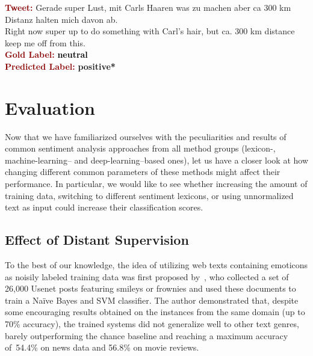 \begin{example}\label{snt:cgsa:exmp:lba-error}
  \noindent\textup{\bfseries\textcolor{darkred}{Tweet:}} {\upshape
    \colorbox{green!0.5!blue!0.4}{Gerade} \colorbox{green!89}{super} \colorbox{blue!0.3}{Lust}, mit \colorbox{white!2}{Carls} Haaren \colorbox{white!0.6}{was} zu \colorbox{green!1}{machen} \colorbox{green!0.3}{aber} \colorbox{white!2}{ca} 300 \colorbox{white!1}{km}
    \colorbox{white!1}{Distanz} halten \colorbox{blue!0.3}{mich} davon \colorbox{white!1}{ab}.}\\
  \noindent \colorbox{green!0.5!blue!0.4}{Right now} \colorbox{green!89}{super} \colorbox{blue!0.3}{up to} \colorbox{green!1}{do} \colorbox{white!0.6}{something} with \colorbox{white!2}{Carl}'s hair, \colorbox{green!0.3}{but} \colorbox{white!2}{ca.} 300 \colorbox{white!1}{km}
  \colorbox{white!1}{distance} keep \colorbox{blue!0.3}{me} \colorbox{white!1}{off} from this.\\[\exampleSep]
  \noindent\textup{\bfseries\textcolor{darkred}{Gold Label:}}\hspace*{4.3em}\textbf{%
    \upshape\textcolor{black}{neutral}}\\
 \noindent\textup{\bfseries\textcolor{darkred}{Predicted Label:}}\hspace*{2em}\textbf{%
    \upshape\textcolor{green3}{positive*}}
\end{example}


\section{Evaluation}

Now that we have familiarized ourselves with the peculiarities and
results of common sentiment analysis approaches from all method groups
(lexicon-, machine-learning-- and deep-learning--based ones), let us
have a closer look at how changing different common parameters of
these methods might affect their performance.  In particular, we would
like to see whether increasing the amount of training data, switching
to different sentiment lexicons, or using unnormalized text as input
could increase their classification scores.

\subsection{Effect of Distant Supervision}
\todo[inline]{}

To the best of our knowledge, the idea of utilizing web texts
containing emoticons as noisily labeled training data was first
proposed by~\citet{Read:05}, who collected a set of 26,000 Usenet
posts featuring smileys or frownies and used these documents to train
a Na{\"i}ve Bayes and SVM classifier.  The author demonstrated that,
despite some encouraging results obtained on the instances from the
same domain (up to 70\% accuracy), the trained systems did not
generalize well to other text genres, barely outperforming the chance
baseline and reaching a maximum accuracy of~54.4\% on news data and
56.8\% on movie reviews.


